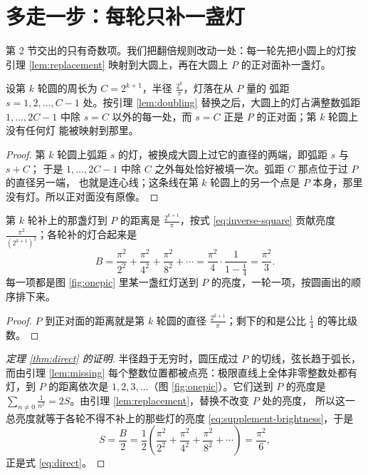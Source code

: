\section{多走一步：每轮只补一盏灯}\label{sec:one-more-step}

第 2 节交出的只有奇数项。我们把翻倍规则改动一处：每一轮先把小圆上的灯按引理
\ref{lem:replacement} 映射到大圆上，再在大圆上 $P$ 的正对面补一盏灯。

\begin{lemma}[缺位]\label{lem:missing}
设第 $k$ 轮圆的周长为 $C=2^{k+1}$，半径 $\frac{2^{k}}{\pi}$，灯落在从 $P$ 量的
弧距 $s=1,2,\dots,C-1$ 处。按引理 \ref{lem:doubling} 替换之后，大圆上的灯占满整数弧距
$1,\dots,2C-1$ 中除 $s=C$ 以外的每一处，而 $s=C$ 正是 $P$ 的正对面；第 $k$ 轮圆上没有任何灯
能被映射到那里。
\end{lemma}

\begin{proof}
第 $k$ 轮圆上弧距 $s$ 的灯，被换成大圆上过它的直径的两端，即弧距 $s$ 与 $s+C$；
于是 $1,\dots,2C-1$ 中除 $C$ 之外每处恰好被填一次。弧距 $C$ 那点位于过 $P$ 的直径另一端，
也就是连心线；这条线在第 $k$ 轮圆上的另一个点是 $P$ 本身，那里没有灯。所以正对面没有原像。
\end{proof}

\begin{proposition}[补上的灯的亮度]\label{prop:added}
第 $k$ 轮补上的那盏灯到 $P$ 的距离是 $\frac{2^{k+1}}{\pi}$，按式 \eqref{eq:inverse-square}
贡献亮度 $\frac{\pi^{2}}{(2^{k+1})^{2}}$；各轮补的灯合起来是
\begin{equation}
  B=\frac{\pi^{2}}{2^{2}}+\frac{\pi^{2}}{4^{2}}+\frac{\pi^{2}}{8^{2}}+\cdots
   =\frac{\pi^{2}}{4}\cdot\frac{1}{1-\frac14}
   =\frac{\pi^{2}}{3}.
  \label{eq:supplement-brightness}
\end{equation}
每一项都是图 \ref{fig:onepic} 里某一盏红灯送到 $P$ 的亮度，一轮一项，按圆画出的顺序排下来。
\end{proposition}

\begin{proof}
$P$ 到正对面的距离就是第 $k$ 轮圆的直径 $\frac{2^{k+1}}{\pi}$；剩下的和是公比 $\frac14$
的等比级数。
\end{proof}

\begin{proof}[定理 \ref{thm:direct} 的证明]
半径趋于无穷时，圆压成过 $P$ 的切线，弦长趋于弧长，而由引理 \ref{lem:missing}
每个整数位置都被点亮：极限直线上全体非零整数处都有灯，到 $P$ 的距离依次是
$1,2,3,\dots$（图 \ref{fig:onepic}）。它们送到 $P$ 的亮度是
$\sum_{n\neq0}\frac{1}{n^{2}}=2S$。由引理 \ref{lem:replacement}，替换不改变 $P$ 处的亮度，
所以这一总亮度就等于各轮不得不补上的那些灯的亮度 \eqref{eq:supplement-brightness}，于是
\begin{equation*}
  S=\frac{B}{2}
   =\frac{1}{2}\left(\frac{\pi^{2}}{2^{2}}+\frac{\pi^{2}}{4^{2}}+\frac{\pi^{2}}{8^{2}}+\cdots\right)
   =\frac{\pi^{2}}{6},
\end{equation*}
正是式 \eqref{eq:direct}。
\end{proof}

